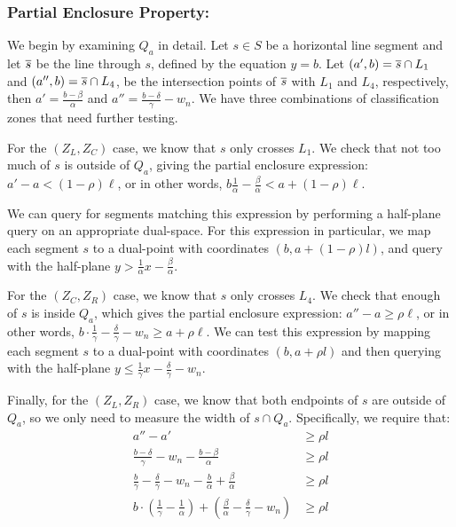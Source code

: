 \subsubsection{Partial Enclosure Property:}
We begin by examining $Q_a$ in detail.
Let $s \in S$ be a horizontal line segment and let $\overline{s}$ be the line 
through $s$, defined by the equation $y = b$.
Let $(a', b) = \overline{s} \cap L_1$ and $(a'', b) = \overline{s} \cap L_4$, be the 
intersection points of $\overline{s}$ with $L_1$ and $L_4$, respectively, then $a' 
= \frac{b - \beta}{\alpha}$ and $a'' = \frac{b - \delta}{\gamma} - w_n$.
We have three combinations of classification zones that need further testing.

For the $(Z_L, Z_C)$ case, we know that $s$ only crosses $L_1$.
We check that not too much of $s$ is outside of $Q_a$, giving the  partial 
enclosure expression: $a' - a < (1 - \rho)\ell$, or in other words, 
$b \frac{1}{\alpha} - \frac{\beta}{\alpha} < a + (1 - \rho)\ell$.

We can query for segments matching this expression by performing a 
half-plane query on an appropriate dual-space.
For this expression in particular, we map each segment $s$ to a dual-point with 
coordinates $(b, a + (1-\rho)l)$, and query with the half-plane $y > 
\frac{1}{\alpha} x - \frac{\beta}{\alpha}$.

For the $(Z_C, Z_R)$ case, we know that $s$ only crosses $L_4$. 
We check that enough of $s$ is inside $Q_a$, which gives the  partial enclosure 
expression: $a'' - a \geq \rho \ell$, or in other words, $b \cdot 
\frac{1}{\gamma} - \frac{\delta}{\gamma} - w_n \geq a + \rho \ell$.
 We can test this expression by mapping each segment $s$ to a 
dual-point with coordinates $(b, a + \rho l)$ and then querying with the 
half-plane $y \leq \frac{1}{\gamma} x - \frac{\delta}{\gamma} - w_n$.

Finally, for the $(Z_L, Z_R)$ case, we know that both endpoints of $s$ are 
outside of $Q_a$, so we only need to measure the width of $s \cap Q_a$.  
Specifically, we require that:
\[
\begin{split} 
a'' - a' &\geq \rho l \\
%
\frac{b - \delta}{\gamma} - w_n - \frac{b - \beta}{\alpha} &\geq \rho l \\
%
\frac{b}{\gamma} - \frac{\delta}{\gamma} - w_n - \frac{b}{\alpha} + 
\frac{\beta}{\alpha} &\geq \rho l \\
%
b \cdot \left ( \frac{1}{\gamma} - \frac{1}{\alpha} \right ) + \left ( 
\frac{\beta}{\alpha} - \frac{\delta}{\gamma} - w_n \right ) &\geq \rho l \\
%
\end{split}
\]

